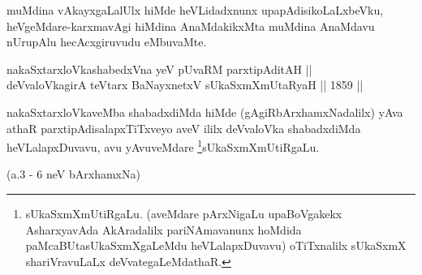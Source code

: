 \begin{artha}
muMdina vAkayxgaLalUlx hiMde heVLidadxnunx upapAdisikoLaLxbeVku,
heVgeMdare-karxmavAgi hiMdina AnaMdakikxMta muMdina AnaMdavu nUrupAlu
hecAcxgiruvudu eMbuvaMte.
\end{artha}


\begin{shl}
nakaSxtarxloVkashabedxVna yeV pUvaRM parxtipAditAH ||  \\
deVvaloVkagirA teV\s tarx BaNayxnetxV sUkaSxmXmUtaRyaH \hfill || 1859 ||  
\end{shl}

\begin{artha}
nakaSxtarxloVkaveMba shabadxdiMda hiMde (gAgiRbArxhamxNadalilx) yAva
athaR parxtipAdisalapxTiTxveyo aveV ililx deVvaloVka shabadxdiMda
heVLalapxDuvavu, avu yAvuveMdare \footnote{sUkaSxmXmUtiRgaLu.
(aveMdare pArxNigaLu upaBoVgakekx AsharxyavAda AkAradalilx
pariNAmavanunx hoMdida paMcaBUtasUkaSxmXgaLeMdu heVLalapxDuvavu)
oTiTxnalilx sUkaSxmX shariVravuLaLx deVvategaLeMdathaR.}sUkaSxmXmUtiRgaLu.
\end{artha}

(a.3 - 6 neV bArxhamxNa)  
